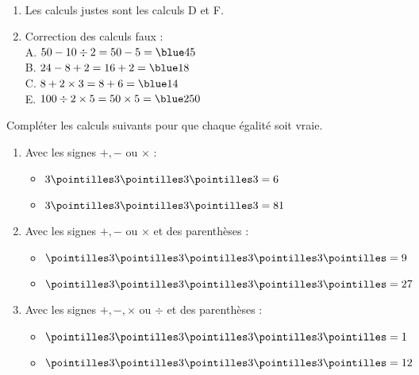 \documentclass[nocrop]{sesamanuel_college_5e_new}
\begin{document}
\begin{colonne*exercice}
\begin{corrige}
   \ \\ [-5mm]
   \begin{enumerate}
      \item Les calculs justes sont les calculs {\blue D} et {\blue F}. \smallskip
      \item Correction des calculs faux : \\
         A. $50-10\div2 =50-5 ={\blue 45}$ \\ [1mm]
         B. $24-8+2 =16+2 ={\blue 18}$ \\ [1mm]
         C. $8+2\times3 =8+6 ={\blue 14}$ \\ [1mm]
         E. $100\div2\times5 =50\times5 = {\blue 250}$
   \end{enumerate}
\end{corrige}

\bigskip


\begin{exercice}%
   Compléter les calculs suivants pour que chaque égalité soit vraie.
   \begin{enumerate}
      \item Avec les signes $+, -$ ou $\times$ : \bigskip
      \begin{itemize}
         \item $3 \pointilles 3 \pointilles 3 \pointilles 3 = 6$ \bigskip
         \item $3 \pointilles 3 \pointilles 3 \pointilles 3 = 81$ \medskip
      \end{itemize}
      \item Avec les signes $+, -$ ou $\times$ et des parenthèses : \bigskip
      \begin{itemize}
         \item $\pointilles 3 \pointilles 3 \pointilles 3 \pointilles 3 \pointilles = 9$ \bigskip
         \item $\pointilles 3 \pointilles 3 \pointilles 3 \pointilles 3 \pointilles = 27$ \medskip
      \end{itemize}
      \item Avec les signes $+, -,\times$ ou $\div$ et des parenthèses : \bigskip
      \begin{itemize}
         \item $\pointilles 3 \pointilles 3 \pointilles 3 \pointilles 3 \pointilles = 1$ \bigskip
         \item $\pointilles 3 \pointilles 3 \pointilles 3 \pointilles 3 \pointilles = 12$
      \end{itemize}
   \end{enumerate}
\end{exercice}


\end{colonne*exercice}
\end{document}
